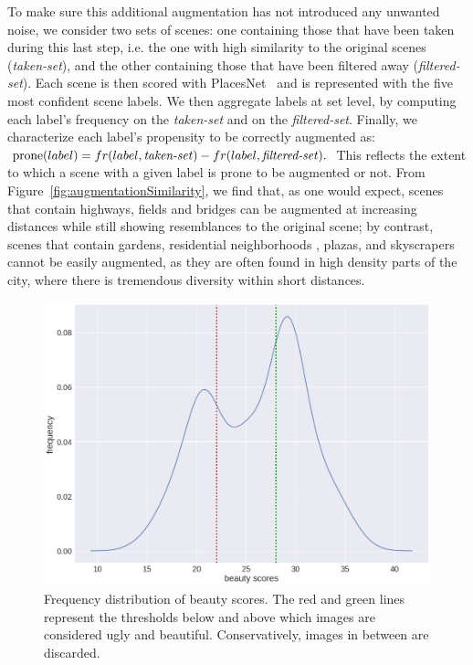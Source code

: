 To make sure this additional augmentation has not introduced any unwanted noise, we consider  two sets of scenes: one containing those that have been taken during this last step, i.e. the one with high similarity to the original scenes (\emph{taken-set}), and the other containing those that have been filtered away (\emph{filtered-set}). Each scene is then scored with PlacesNet~\cite{zhou2014learning} and is represented with the five most confident scene labels. We then aggregate labels at set level, by computing each label's frequency on the \emph{taken-set} %
and on the \emph{filtered-set}. Finally, we characterize each label's propensity to be correctly augmented as: 
$ \textrm{prone}(label)= fr(label,\textrm{\emph{taken-set}}) - fr(label,\textrm{\emph{filtered-set}}).$
This reflects the extent to which a scene with a given label is prone to be augmented or not. From Figure~\ref{fig:augmentationSimilarity}, we find that, as one would expect, scenes that contain highways, fields and bridges can be augmented at increasing distances while still showing resemblances to the original scene; by contrast, scenes that contain gardens, residential neighborhoods , plazas, and skyscrapers cannot be easily augmented, as they are often found in high density parts of the city, where there is tremendous diversity within short distances. 


\begin{figure}[t!]
    \centering
    \includegraphics[width=0.7\columnwidth]{Trueskill.png}
    \caption{Frequency distribution of beauty scores. The red and green lines represent the thresholds below and above which images are considered ugly and beautiful. Conservatively, images in between are discarded.}
    \label{fig:Trueskill}
\end{figure}


